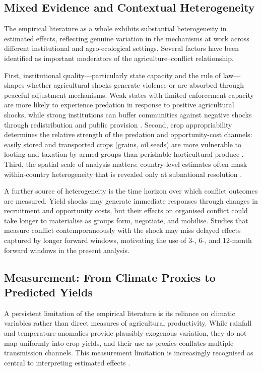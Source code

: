 \subsection{Mixed Evidence and Contextual Heterogeneity}

The empirical literature as a whole exhibits substantial heterogeneity in estimated effects, reflecting genuine variation in the mechanisms at work across different institutional and agro-ecological settings. Several factors have been identified as important moderators of the agriculture--conflict relationship.

First, institutional quality---particularly state capacity and the rule of law---shapes whether agricultural shocks generate violence or are absorbed through peaceful adjustment mechanisms. Weak states with limited enforcement capacity are more likely to experience predation in response to positive agricultural shocks, while strong institutions can buffer communities against negative shocks through redistribution and public provision \citep{BesleyPersson2011}. Second, crop appropriability determines the relative strength of the predation and opportunity-cost channels: easily stored and transported crops (grains, oil seeds) are more vulnerable to looting and taxation by armed groups than perishable horticultural produce \citep{RapoportTernstrm2011}. Third, the spatial scale of analysis matters: country-level estimates often mask within-country heterogeneity that is revealed only at subnational resolution \citep{HarariLaFerrara2018}.

A further source of heterogeneity is the time horizon over which conflict outcomes are measured. Yield shocks may generate immediate responses through changes in recruitment and opportunity costs, but their effects on organised conflict could take longer to materialise as groups form, negotiate, and mobilise. Studies that measure conflict contemporaneously with the shock may miss delayed effects captured by longer forward windows, motivating the use of 3-, 6-, and 12-month forward windows in the present analysis.

\subsection{Measurement: From Climate Proxies to Predicted Yields}

A persistent limitation of the empirical literature is its reliance on climatic variables rather than direct measures of agricultural productivity. While rainfall and temperature anomalies provide plausibly exogenous variation, they do not map uniformly into crop yields, and their use as proxies conflates multiple transmission channels. This measurement limitation is increasingly recognised as central to interpreting estimated effects \citep{BurkeFergusonHsiangMiguel2024}.

